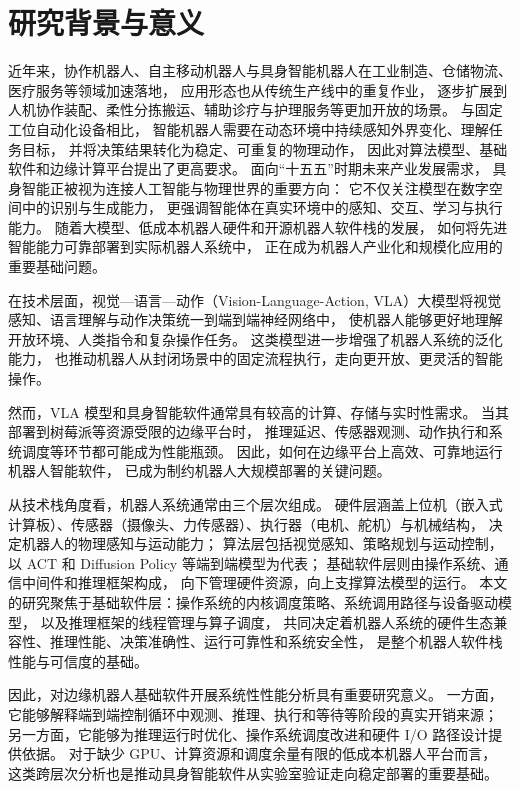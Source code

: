 \section{研究背景与意义}

近年来，协作机器人、自主移动机器人与具身智能机器人在工业制造、仓储物流、医疗服务等领域加速落地，
应用形态也从传统生产线中的重复作业，
逐步扩展到人机协作装配、柔性分拣搬运、辅助诊疗与护理服务等更加开放的场景。
与固定工位自动化设备相比，
智能机器人需要在动态环境中持续感知外界变化、理解任务目标，
并将决策结果转化为稳定、可重复的物理动作，
因此对算法模型、基础软件和边缘计算平台提出了更高要求。
面向“十五五”时期未来产业发展需求，
具身智能正被视为连接人工智能与物理世界的重要方向：
它不仅关注模型在数字空间中的识别与生成能力，
更强调智能体在真实环境中的感知、交互、学习与执行能力。
随着大模型、低成本机器人硬件和开源机器人软件栈的发展，
如何将先进智能能力可靠部署到实际机器人系统中，
正在成为机器人产业化和规模化应用的重要基础问题。

在技术层面，视觉—语言—动作（Vision-Language-Action, VLA）大模型将视觉感知、语言理解与动作决策统一到端到端神经网络中，
使机器人能够更好地理解开放环境、人类指令和复杂操作任务。
这类模型进一步增强了机器人系统的泛化能力，
也推动机器人从封闭场景中的固定流程执行，走向更开放、更灵活的智能操作。

然而，VLA 模型和具身智能软件通常具有较高的计算、存储与实时性需求。
当其部署到树莓派等资源受限的边缘平台时，
推理延迟、传感器观测、动作执行和系统调度等环节都可能成为性能瓶颈。
因此，如何在边缘平台上高效、可靠地运行机器人智能软件，
已成为制约机器人大规模部署的关键问题。

从技术栈角度看，机器人系统通常由三个层次组成。
硬件层涵盖上位机（嵌入式计算板）、传感器（摄像头、力传感器）、执行器（电机、舵机）与机械结构，
决定机器人的物理感知与运动能力；
算法层包括视觉感知、策略规划与运动控制，
以 ACT\cite{act} 和 Diffusion Policy\cite{diffusionpolicy} 等端到端模型为代表；
基础软件层则由操作系统、通信中间件和推理框架构成，
向下管理硬件资源，向上支撑算法模型的运行。
本文的研究聚焦于基础软件层：操作系统的内核调度策略、系统调用路径与设备驱动模型，
以及推理框架的线程管理与算子调度，
共同决定着机器人系统的硬件生态兼容性、推理性能、决策准确性、运行可靠性和系统安全性，
是整个机器人软件栈性能与可信度的基础。

因此，对边缘机器人基础软件开展系统性性能分析具有重要研究意义。
一方面，它能够解释端到端控制循环中观测、推理、执行和等待等阶段的真实开销来源；
另一方面，它能够为推理运行时优化、操作系统调度改进和硬件 I/O 路径设计提供依据。
对于缺少 GPU、计算资源和调度余量有限的低成本机器人平台而言，
这类跨层次分析也是推动具身智能软件从实验室验证走向稳定部署的重要基础。

